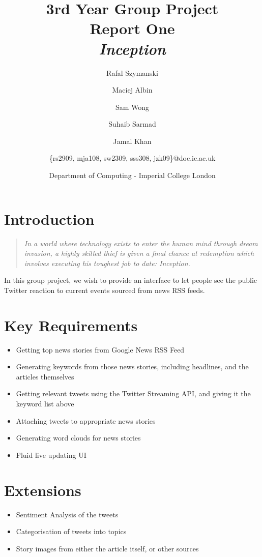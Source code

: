 \documentclass[a4paper,11pt]{article}
\title{3rd Year Group Project\\Report One\\\emph{Inception}}
\author{
    \small{Rafal Szymanski}\\
  	\and
    \small{Maciej Albin}\\
    \and
    \small{Sam Wong}\\
    \and
    \small{Suhaib Sarmad}\\
		\and
		\small{Jamal Khan}\\
		\and
		\small{\{rs2909, mja108, sw2309, sss308, jzk09\}@doc.ic.ac.uk}
		\and
		\small{Department of Computing - Imperial College London}
}
\begin{document}
 
	\maketitle
	
	\section{Introduction}
	
	\begin{quote}
\emph{In a world where technology exists to enter the human mind through dream invasion, a highly skilled thief is given a final chance at redemption which involves executing his toughest job to date: Inception.}	\end{quote}

	In this group project, we wish to provide an interface to let people see the public Twitter reaction to current events sourced from news RSS feeds.

	
	\section{Key Requirements}
		
		\begin{itemize}
			\item Getting top news stories from Google News RSS Feed
			\item Generating keywords from those news stories, including headlines, and the articles themselves
			\item Getting relevant tweets using the Twitter Streaming API, and giving it the keyword list above
			\item Attaching tweets to appropriate news stories
			\item Generating word clouds for news stories
			\item Fluid live updating UI
		\end{itemize}
		
	\section{Extensions}
	
		\begin{itemize}
			\item Sentiment Analysis of the tweets
			\item Categorisation of tweets into topics
			\item Story images from either the article itself, or other sources
		\end{itemize}
	
\end{document}
